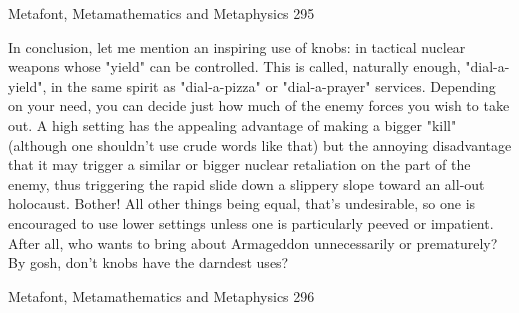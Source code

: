 Metafont, Metamathematics and Metaphysics                                              295

        In conclusion, let me mention an inspiring use of knobs: in tactical nuclear
weapons whose "yield" can be controlled. This is called, naturally enough, "dial-a-yield",
in the same spirit as "dial-a-pizza" or "dial-a-prayer" services. Depending on your need,
you can decide just how much of the enemy forces you wish to take out. A high setting
has the appealing advantage of making a bigger "kill" (although one shouldn't use crude
words like that) but the annoying disadvantage that it may trigger a similar or bigger
nuclear retaliation on the part of the enemy, thus triggering the rapid slide down a
slippery slope toward an all-out holocaust. Bother! All other things being equal, that's
undesirable, so one is encouraged to use lower settings unless one is particularly peeved
or impatient. After all, who wants to bring about Armageddon unnecessarily or
prematurely? By gosh, don't knobs have the darndest uses?




Metafont, Metamathematics and Metaphysics                                             296

